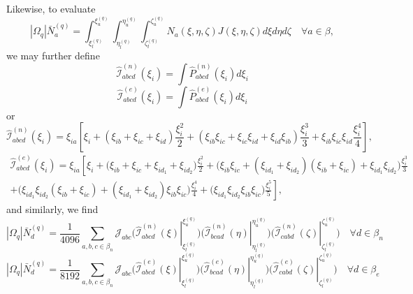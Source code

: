 \documentclass[11pt]{article} %
\begin{document}
Likewise, to evaluate
\begin{equation}
	| \Omega_q | \bar{N}_{a}^{(q)} = \int_{\xi^{(q)}_{l}}^{\xi^{(q)}_{u}} \int_{\eta^{(q)}_{l}}^{\eta^{(q)}_{u}} \int_{\zeta^{(q)}_{l}}^{\zeta^{(q)}_{u}} N_a ( \xi, \eta, \zeta ) J( \xi, \eta, \zeta ) d \xi d \eta d \zeta \quad \forall a \in \beta,
\end{equation}
we may further define
\begin{equation}
	\hat{\mathcal{I}}^{(n)}_{abcd} (\xi_i) = \int \hat{P}^{(n)}_{abcd} (\xi_i) d \xi_i
\end{equation}
\begin{equation}
	\hat{\mathcal{I}}^{(e)}_{abcd} (\xi_i) = \int \hat{P}^{(e)}_{abcd} (\xi_i) d \xi_i
\end{equation}
or
\begin{equation}
	\hat{\mathcal{I}}^{(n)}_{abcd} (\xi_i) = \xi_{ia} \left[\xi_i + (\xi_{ib} + \xi_{ic} + \xi_{id}) \frac{\xi_i^2}{2} + (\xi_{ib} \xi_{ic} + \xi_{ic} \xi_{id} + \xi_{id} \xi_{ib}) \frac{\xi_i^3}{3} + \xi_{ib} \xi_{ic} \xi_{id} \frac{\xi_i^4}{4} \right],
\end{equation}
\begin{eqnarray}
	\hat{\mathcal{I}}^{(e)}_{abcd} (\xi_i) = \xi_{ia} \left[ \xi_i + \bigg( \xi_{ib} + \xi_{ic} + \xi_{id_1} + \xi_{id_2} \bigg) \frac{\xi_i^2}{2} + \bigg( \xi_{ib} \xi_{ic} + (\xi_{id_1} + \xi_{id_2}) (\xi_{ib} + \xi_{ic}) + \xi_{id_1} \xi_{id_2} \bigg) \frac{\xi_{i}^3}{3} \right. \nonumber \\ \left. + \bigg( \xi_{id_1} \xi_{id_2} (\xi_{ib} + \xi_{ic}) + (\xi_{id_1} + \xi_{id_2}) \xi_{ib} \xi_{ic} \bigg) \frac{\xi_i^4}{4} + \bigg( \xi_{id_1} \xi_{id_2} \xi_{ib} \xi_{ic} \bigg) \frac{\xi_i^5}{5} \right],
\end{eqnarray}
and similarly, we find
\begin{equation}
	| \Omega_q | \bar{N}_{d}^{(q)} = \frac{1}{4096} \sum_{a,b,c \in \beta_n} \mathcal{J}_{abc} \bigg( \left. \hat{\mathcal{I}}^{(n)}_{abcd} (\xi) \right|^{\xi^{(q)}_{u}}_{\xi^{(q)}_{l}} \bigg) \bigg( \left. \hat{\mathcal{I}}^{(n)}_{bcad} (\eta) \right|^{\eta^{(q)}_{u}}_{\eta^{(q)}_{l}} \bigg) \bigg( \left. \hat{\mathcal{I}}^{(n)}_{cabd} (\zeta) \right|^{\zeta^{(q)}_{u}}_{\zeta^{(q)}_{l}} \bigg) \quad \forall d \in \beta_n
\end{equation}
\begin{equation}
	| \Omega_q | \bar{N}_{d}^{(q)} = \frac{1}{8192} \sum_{a,b,c \in \beta_n} \mathcal{J}_{abc} \bigg( \left. \hat{\mathcal{I}}^{(e)}_{abcd} (\xi) \right|^{\xi^{(q)}_{u}}_{\xi^{(q)}_{l}} \bigg) \bigg( \left. \hat{\mathcal{I}}^{(e)}_{bcad} (\eta) \right|^{\eta^{(q)}_{u}}_{\eta^{(q)}_{l}} \bigg) \bigg( \left. \hat{\mathcal{I}}^{(e)}_{cabd} (\zeta) \right|^{\zeta^{(q)}_{u}}_{\zeta^{(q)}_{l}} \bigg) \quad \forall d \in \beta_e
\end{equation}
\end{document}
